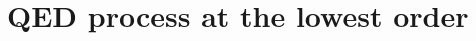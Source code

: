 \documentclass[main.tex]{subfiles}
\begin{document}
\section{QED process at the lowest order}

\end{document}
